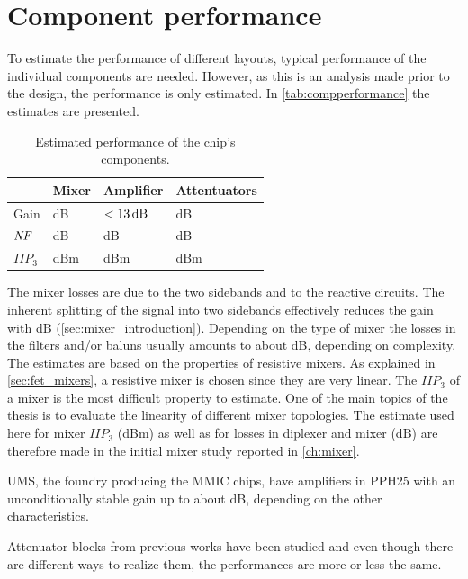 	\section{Component performance}
		To estimate the performance of different layouts, typical performance of the individual components are needed. However, as this is an analysis made prior to the design, the performance is only estimated. In \autoref{tab:compperformance} the estimates are presented.

		\begin{table}[hbt!]
			\caption[Estimated performance of chip components.]{Estimated performance of the chip's components.}
			\label{tab:compperformance}
			\centering
			\begin{tabular}{ l l l l } \toprule
				& Mixer & Amplifier & Attentuators \\\midrule
				Gain & \unit[-8]{dB} & $\unit[<13]{dB}$ & \unit[-2--12]{dB} \\
				$\emph{NF}$ & \unit[8]{dB} & \unit[1--2]{dB} & \unit[2--12]{dB} \\
				$IIP_3$ & \unit[20--27]{dBm} & \unit[14--22]{dBm} & \unit[30]{dBm} \\\bottomrule
			\end{tabular}
		\end{table}

		The mixer losses are due to the two sidebands and to the reactive circuits. The inherent splitting of the signal into two sidebands effectively reduces the gain with \unit[3]{dB} (\autoref{sec:mixer_introduction}). Depending on the type of mixer the losses in the filters and/or baluns usually amounts to about \unit[3--7]{dB}, depending on complexity. The estimates are based on the properties of resistive mixers. As explained in \autoref{sec:fet_mixers}, a resistive mixer is chosen since they are very linear. The $IIP_3$ of a mixer is the most difficult property to estimate. One of the main topics of the thesis is to evaluate the linearity of different mixer topologies. The estimate used here for mixer $IIP_3$ (\unit[25]{dBm}) as well as for losses in diplexer and mixer (\unit[8]{dB}) are therefore made in the initial mixer study reported in \autoref{ch:mixer}.

		UMS, the foundry producing the MMIC chips, have amplifiers in PPH25 with an unconditionally stable gain up to about \unit[13]{dB}, depending on the other characteristics.\autocite{pph25manual}

		Attenuator blocks from previous works have been studied and even though there are different ways to realize them, the performances are more or less the same.\autocite{gustavsson07}

